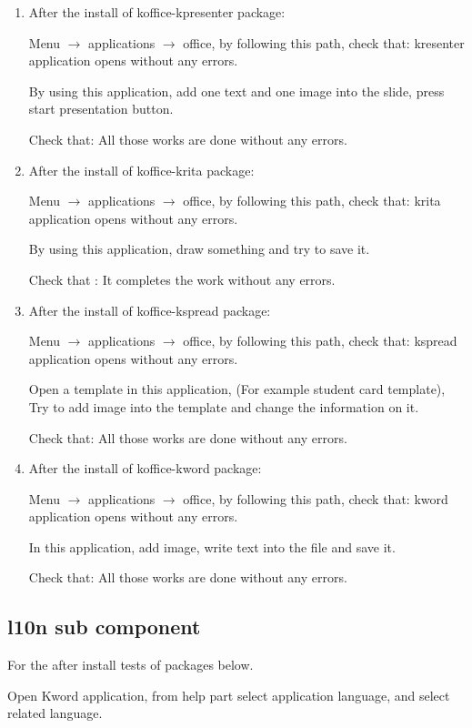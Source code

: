 \documentclass[a4paper,10pt]{article}
\begin{document}
\begin{enumerate}
\item After the install of koffice-kpresenter package:

Menu $\rightarrow$ applications $\rightarrow$ office, by following this path, check that: kresenter application opens without any errors.

By using this application, add one text and one image into the slide, press start presentation button.

Check that: All those works are done without any errors.

\item After the install of koffice-krita package:

Menu $\rightarrow$ applications $\rightarrow$ office, by following this path, check that: krita application opens without any errors.

By using this application, draw  something and try to save it.

Check that : It completes the work without any errors.

\item After the install of koffice-kspread package:

Menu $\rightarrow$ applications $\rightarrow$ office, by following this path, check that: kspread application opens without any errors.

Open a template in this application, (For example student card template), Try to add image into the template and change the information on it.

Check that: All those works are done without any errors.

\item After the install of koffice-kword package:

Menu $\rightarrow$ applications $\rightarrow$ office, by following this path, check that: kword application opens without any errors.

In this application, add image, write text into the file and save it.

Check that: All those works are done without any errors.
\end{enumerate}
\subsection*{l10n sub component}
For the after install tests of packages below. 

Open Kword application, from help part select application language, and select related language. 
\end{document}
